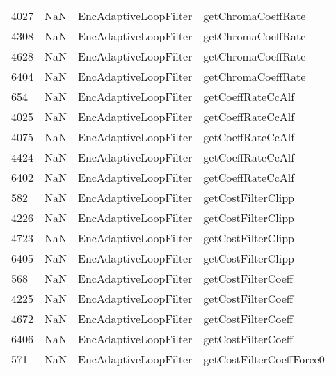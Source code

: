 \begin{tabular}{llll}
4027 &                   NaN &      EncAdaptiveLoopFilter &                        getChromaCoeffRate \\
4308 &                   NaN &      EncAdaptiveLoopFilter &                        getChromaCoeffRate \\
4628 &                   NaN &      EncAdaptiveLoopFilter &                        getChromaCoeffRate \\
6404 &                   NaN &      EncAdaptiveLoopFilter &                        getChromaCoeffRate \\
654  &                   NaN &      EncAdaptiveLoopFilter &                         getCoeffRateCcAlf \\
4025 &                   NaN &      EncAdaptiveLoopFilter &                         getCoeffRateCcAlf \\
4075 &                   NaN &      EncAdaptiveLoopFilter &                         getCoeffRateCcAlf \\
4424 &                   NaN &      EncAdaptiveLoopFilter &                         getCoeffRateCcAlf \\
6402 &                   NaN &      EncAdaptiveLoopFilter &                         getCoeffRateCcAlf \\
582  &                   NaN &      EncAdaptiveLoopFilter &                        getCostFilterClipp \\
4226 &                   NaN &      EncAdaptiveLoopFilter &                        getCostFilterClipp \\
4723 &                   NaN &      EncAdaptiveLoopFilter &                        getCostFilterClipp \\
6405 &                   NaN &      EncAdaptiveLoopFilter &                        getCostFilterClipp \\
568  &                   NaN &      EncAdaptiveLoopFilter &                        getCostFilterCoeff \\
4225 &                   NaN &      EncAdaptiveLoopFilter &                        getCostFilterCoeff \\
4672 &                   NaN &      EncAdaptiveLoopFilter &                        getCostFilterCoeff \\
6406 &                   NaN &      EncAdaptiveLoopFilter &                        getCostFilterCoeff \\
571  &                   NaN &      EncAdaptiveLoopFilter &                  getCostFilterCoeffForce0 \\

\end{tabular}
